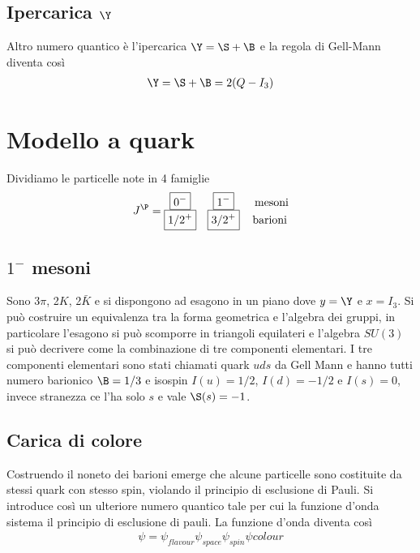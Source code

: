 \documentclass[12pt]{book}
\begin{document}
\subsection{Ipercarica $\Y$}
Altro numero quantico è l'ipercarica $\Y=\S+\B$ e la regola di Gell-Mann diventa così
\begin{gather}
	\Y = \S+ \B = 2(Q-I_3)
\end{gather}



\newpage
\section{Modello a quark}

Dividiamo le particelle note in 4 famiglie
\begin{gather}
	J^\P = \begin{matrix}
		\boxed{0^-} & \boxed{1^-} & \text{ mesoni}\\
		\boxed{1/2^+} & \boxed{3/2^+} & \text{barioni} 
	\end{matrix}
\end{gather}
\subsection{$1^-$ mesoni}
Sono 3$\pi$, 2$K$, 2$\bar K$ e si dispongono ad esagono in un piano dove $y=\Y$ e $x=I_3$. Si può costruire un equivalenza tra la forma geometrica e l'algebra dei gruppi, in particolare l'esagono si può scomporre in triangoli equilateri e l'algebra $SU(3)$ si può decrivere come la combinazione di tre componenti elementari. I tre componenti elementari sono stati chiamati quark $u d s$ da Gell Mann e hanno tutti numero barionico $\B=1/3$ e isospin $I(u)=1/2$, $I(d)=-1/2$ e $I(s)=0$, invece stranezza ce l'ha solo $s$ e vale $\S(s)=-1$.

\subsection{Carica di colore}
Costruendo il noneto dei barioni emerge che alcune particelle sono costituite da stessi quark con stesso spin, violando il principio di esclusione di Pauli. Si introduce così un ulteriore numero quantico tale per cui la funzione d'onda sistema il principio di esclusione di pauli. La funzione d'onda diventa così
\begin{gather}
	\psi = \psi_{flavour} \psi_{space} \psi_{spin} \psi{colour}
\end{gather}
\end{document}

